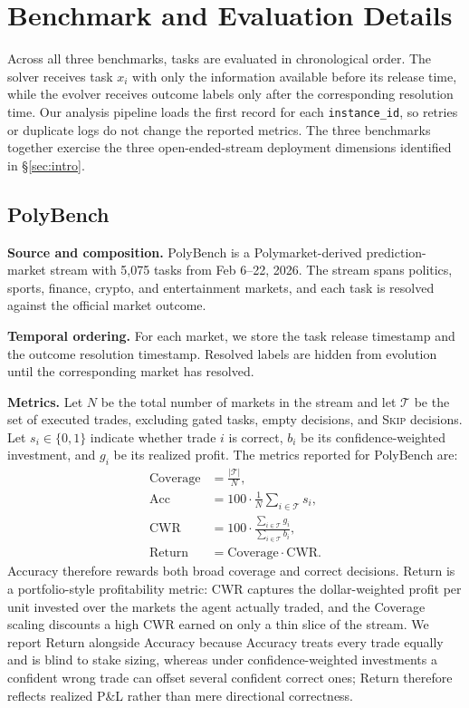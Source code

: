 
\clearpage
\section{Benchmark and Evaluation Details}
\label{app:benchmarks}

Across all three benchmarks, tasks are evaluated in chronological order. The solver receives task $x_i$ with only the information available before its release time, while the evolver receives outcome labels only after the corresponding resolution time. Our analysis pipeline loads the first record for each \texttt{instance\_id}, so retries or duplicate logs do not change the reported metrics. The three benchmarks together exercise the three open-ended-stream deployment dimensions identified in \S\ref{sec:intro}.

\subsection{PolyBench}

\noindent\textbf{Source and composition.}
PolyBench is a Polymarket-derived prediction-market stream with 5{,}075 tasks from Feb 6--22, 2026. The stream spans politics, sports, finance, crypto, and entertainment markets, and each task is resolved against the official market outcome.

\noindent\textbf{Temporal ordering.}
For each market, we store the task release timestamp and the outcome resolution timestamp. Resolved labels are hidden from evolution until the corresponding market has resolved.

\noindent\textbf{Metrics.}
Let $N$ be the total number of markets in the stream and let $\mathcal{T}$ be the set of executed trades, excluding gated tasks, empty decisions, and \textsc{Skip} decisions. Let $s_i\in\{0,1\}$ indicate whether trade $i$ is correct, $b_i$ be its confidence-weighted investment, and $g_i$ be its realized profit. The metrics reported for PolyBench are:
\begin{align*}
\mathrm{Coverage} &= \tfrac{|\mathcal{T}|}{N}, \\
\mathrm{Acc}      &= 100 \cdot \tfrac{1}{N}\textstyle\sum_{i\in\mathcal{T}} s_i, \\
\mathrm{CWR}      &= 100 \cdot \tfrac{\sum_{i\in\mathcal{T}} g_i}{\sum_{i\in\mathcal{T}} b_i}, \\
\mathrm{Return}   &= \mathrm{Coverage} \cdot \mathrm{CWR}.
\end{align*}
Accuracy therefore rewards both broad coverage and correct decisions. Return is a portfolio-style profitability metric: CWR captures the dollar-weighted profit per unit invested over the markets the agent actually traded, and the Coverage scaling discounts a high CWR earned on only a thin slice of the stream. We report Return alongside Accuracy because Accuracy treats every trade equally and is blind to stake sizing, whereas under confidence-weighted investments a confident wrong trade can offset several confident correct ones; Return therefore reflects realized P\&L rather than mere directional correctness.

